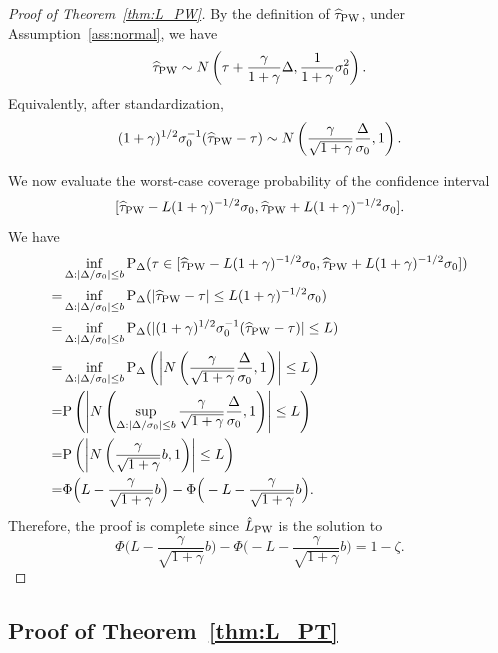 \documentclass[11pt]{article}
\def\P{{\mathrm P}}
\newcommand{\htau}{\widehat\tau}
\numberwithin{equation}{section}
\theoremstyle{definition}
\begin{document}
\begin{proof}[Proof of Theorem~\ref{thm:L_PW}]
  By the definition of $\htau_{\rm PW}$, under Assumption~\ref{ass:normal}, we have 
  \[
    \htau_{\rm PW} \sim N\left(\tau + \frac{\gamma}{1+\gamma} \Delta, \frac{1}{1+\gamma}\sigma_0^2\right).
  \]
  Equivalently, after standardization,
  \begin{align*}
    (1+\gamma)^{1/2} \sigma_0^{-1} (\htau_{\rm PW} - \tau) \sim N\left(\frac{\gamma}{\sqrt{1+\gamma}} \frac{\Delta}{\sigma_0}, 1\right).
  \end{align*}
  
  We now evaluate the worst-case coverage probability of the confidence interval
  \[
    [\htau_{\rm PW} - L (1+\gamma)^{-1/2} \sigma_0, \htau_{\rm PW} + L (1+\gamma)^{-1/2} \sigma_0].
  \]
  We have
  \begin{align*}
    & \inf_{\Delta: \lvert \Delta/\sigma_0 \rvert \le b} \P_\Delta(\tau \in [\htau_{\rm PW} - L (1+\gamma)^{-1/2} \sigma_0, \htau_{\rm PW} + L (1+\gamma)^{-1/2} \sigma_0])\\
    =& \inf_{\Delta: \lvert \Delta/\sigma_0 \rvert \le b} \P_\Delta(\lvert \htau_{\rm PW} - \tau \rvert \le L (1+\gamma)^{-1/2} \sigma_0)\\
    =& \inf_{\Delta: \lvert \Delta/\sigma_0 \rvert \le b} \P_\Delta(\lvert (1+\gamma)^{1/2} \sigma_0^{-1} (\htau_{\rm PW} - \tau) \rvert \le L)\\
    =& \inf_{\Delta: \lvert \Delta/\sigma_0 \rvert \le b} \P_\Delta\left(\left\lvert N\left(\frac{\gamma}{\sqrt{1+\gamma}} \frac{\Delta}{\sigma_0}, 1\right) \right\rvert \le L\right)\\
    =& \P\left( \left\lvert N\left(\sup_{\Delta: \lvert \Delta/\sigma_0 \rvert \le b} \frac{\gamma}{\sqrt{1+\gamma}} \frac{\Delta}{\sigma_0}, 1\right) \right\rvert \le L \right)\\
    =& \P\left( \left\lvert N\left(\frac{\gamma}{\sqrt{1+\gamma}} b, 1\right) \right\rvert \le L \right)\\
    =& \Phi\Big(L - \frac{\gamma}{\sqrt{1+\gamma}} b \Big) - \Phi\Big(-L - \frac{\gamma}{\sqrt{1+\gamma}} b \Big).
  \end{align*}
  Therefore, the proof is complete since $\hat{L}_{\rm PW}$ is the solution to
  \[
    \Phi\Big(L - \frac{\gamma}{\sqrt{1+\gamma}} b \Big) - \Phi\Big(-L - \frac{\gamma}{\sqrt{1+\gamma}} b \Big) = 1-\zeta.
  \] 
\end{proof}

\subsection{Proof of Theorem~\ref{thm:L_PT}}
\end{document}
